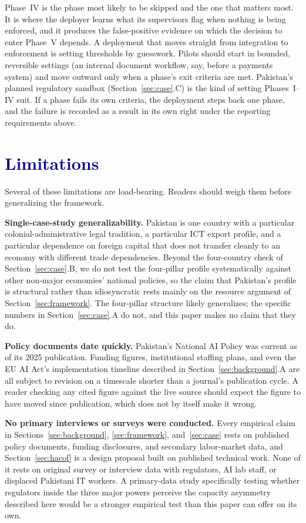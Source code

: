 \documentclass[journal]{IEEEtran}
\begin{document}
Phase~IV is the phase most likely to be skipped and the one that matters most. It is where the deployer learns what its supervisors flag when nothing is being enforced, and it produces the false-positive evidence on which the decision to enter Phase~V depends. A deployment that moves straight from integration to enforcement is setting thresholds by guesswork. Pilots should start in bounded, reversible settings (an internal document workflow, say, before a payments system) and move outward only when a phase's exit criteria are met. Pakistan's planned regulatory sandbox (Section~\ref{sec:case}.C) is the kind of setting Phases~I--IV suit. If a phase fails its own criteria, the deployment steps back one phase, and the failure is recorded as a result in its own right under the reporting requirements above.

\section{\textcolor{darkblue}{Limitations}}
\label{sec:limits}

Several of these limitations are load-bearing. Readers should weigh them before generalizing the framework.

\textbf{Single-case-study generalizability.} Pakistan is one country with a particular colonial-administrative legal tradition, a particular ICT export profile, and a particular dependence on foreign capital that does not transfer cleanly to an economy with different trade dependencies. Beyond the four-country check of Section~\ref{sec:case}.B, we do not test the four-pillar profile systematically against other non-major economies' national policies, so the claim that Pakistan's profile is structural rather than idiosyncratic rests mainly on the resource argument of Section~\ref{sec:framework}. The four-pillar structure likely generalizes; the specific numbers in Section~\ref{sec:case}.A do not, and this paper makes no claim that they do.

\textbf{Policy documents date quickly.} Pakistan's National AI Policy was current as of its 2025 publication. Funding figures, institutional staffing plans, and even the EU AI Act's implementation timeline described in Section~\ref{sec:background}.A are all subject to revision on a timescale shorter than a journal's publication cycle. A reader checking any cited figure against the live source should expect the figure to have moved since publication, which does not by itself make it wrong.

\textbf{No primary interviews or surveys were conducted.} Every empirical claim in Sections~\ref{sec:background}, \ref{sec:framework}, and~\ref{sec:case} rests on published policy documents, funding disclosures, and secondary labor-market data, and Section~\ref{sec:hacof} is a design proposal built on published technical work. None of it rests on original survey or interview data with regulators, AI lab staff, or displaced Pakistani IT workers. A primary-data study specifically testing whether regulators inside the three major powers perceive the capacity asymmetry described here would be a stronger empirical test than this paper can offer on its own.
\end{document}
